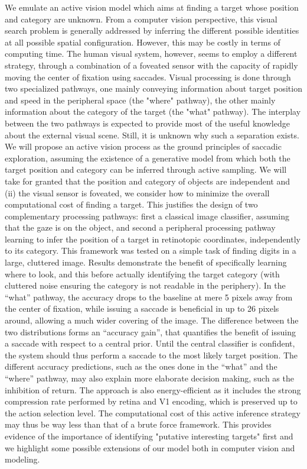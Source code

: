 We emulate an active vision model which aims at finding a target whose position and category are unknown. From a computer vision perspective, this visual search problem is generally addressed by inferring the different possible identities at all possible spatial configuration. However, this may be costly in terms of computing time. The human visual system, however, seems to employ a different strategy, through a combination of a foveated sensor with the capacity of rapidly moving the center of fixation using saccades. Visual processing is done through two specialized pathways, one mainly conveying information about target position and speed in the peripheral space (the "where" pathway), the other mainly information about the category of the target (the "what" pathway). The interplay between the two pathways is expected to provide most of the useful knowledge about the external visual scene. Still, it is unknown why such a separation exists. We will propose an active vision process as the ground principles of saccadic exploration, assuming the existence of a generative model from which both the target position and category can be inferred through active sampling. We will take for granted that the position and category of objects are independent and (ii) the visual sensor is foveated, we consider how to minimize the overall computational cost of finding a target. This justifies the design of two complementary processing pathways: first a classical image classifier, assuming that the gaze is on the object, and second a peripheral processing pathway learning to infer the position of a target in retinotopic coordinates, independently to its category. This framework was tested on a simple task of finding digits in a large, cluttered image. Results demonstrate the benefit of specifically learning where to look, and this before actually identifying the target category (with cluttered noise ensuring the category is not readable in the periphery). In the “what” pathway, the accuracy drops to the baseline at mere 5 pixels away from the center of fixation, while issuing a saccade is beneficial in up to 26 pixels around, allowing a much wider covering of the image. The difference between the two distributions forms an “accuracy gain”, that quantifies the benefit of issuing a saccade with respect to a central prior. Until the central classifier is confident, the system should thus perform a saccade to the most likely target position. The different accuracy predictions, such as the ones done in the “what” and the “where” pathway, may also explain more elaborate decision making, such as the inhibition of return. The approach is also energy-efficient as it includes the strong compression rate performed by retina and V1 encoding, which is preserved up to the action selection level. The computational cost of this active inference strategy may thus be way less than that of a brute force framework. This provides evidence of the importance of identifying "putative interesting targets" first and we highlight some possible extensions of our model both in computer vision and modeling.
